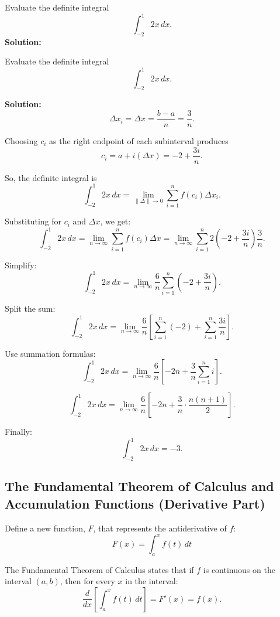 \documentclass[12pt]{article}
\theoremstyle{beautifulthm}
\begin{document}
\begin{tcolorbox}[colback=examplebg, colframe=red!75!black, title=\textbf{EXAMPLE 5: Evaluating a Definite Integral as a Limit}, fonttitle=\bfseries, sharp corners]
Evaluate the definite integral
\[
\int_{-2}^1 2x \, dx.
\]
\tcblower
\textbf{Solution:} 

Evaluate the definite integral
\[
\int_{-2}^1 2x \, dx.
\]

\noindent\textbf{Solution:} 
\[
\Delta x_i = \Delta x = \frac{b - a}{n} = \frac{3}{n}.
\]

\noindent Choosing \( c_i \) as the right endpoint of each subinterval produces
\[
c_i = a + i(\Delta x) = -2 + \frac{3i}{n}.
\]

\noindent So, the definite integral is
\[
\int_{-2}^1 2x \, dx = \lim_{\|\Delta\| \to 0} \sum_{i=1}^n f(c_i) \Delta x_i.
\]

\noindent Substituting for \( c_i \) and \(\Delta x\), we get:
\[
\int_{-2}^1 2x \, dx = \lim_{n \to \infty} \sum_{i=1}^n f(c_i) \Delta x = \lim_{n \to \infty} \sum_{i=1}^n 2\left(-2 + \frac{3i}{n}\right)\frac{3}{n}.
\]

\noindent Simplify:
\[
\int_{-2}^1 2x \, dx = \lim_{n \to \infty} \frac{6}{n} \sum_{i=1}^n \left(-2 + \frac{3i}{n}\right).
\]

\noindent Split the sum:
\[
\int_{-2}^1 2x \, dx = \lim_{n \to \infty} \frac{6}{n} \left[\sum_{i=1}^n (-2) + \sum_{i=1}^n \frac{3i}{n}\right].
\]

\noindent Use summation formulas:
\[
\int_{-2}^1 2x \, dx = \lim_{n \to \infty} \frac{6}{n} \left[-2n + \frac{3}{n} \sum_{i=1}^n i\right].
\]

\[
\int_{-2}^1 2x \, dx = \lim_{n \to \infty} \frac{6}{n} \left[-2n + \frac{3}{n} \cdot \frac{n(n + 1)}{2}\right].
\]

\noindent Finally:
\[
\int_{-2}^1 2x \, dx = -3.
\]
\end{tcolorbox}


\subsection{The Fundamental Theorem of Calculus and Accumulation Functions (Derivative Part)}

\begin{mytheorem}{}{}
    Define a new function, \( F \), that represents the antiderivative of \( f \):
\[
F(x) = \int_a^x f(t) \, dt
\]

The Fundamental Theorem of Calculus states that if \( f \) is continuous on the interval \((a, b)\), then for every \( x \) in the interval:
\[
\frac{d}{dx} \left[ \int_a^x f(t) \, dt \right] = F'(x) = f(x).
\]
\end{mytheorem}
\end{document}
